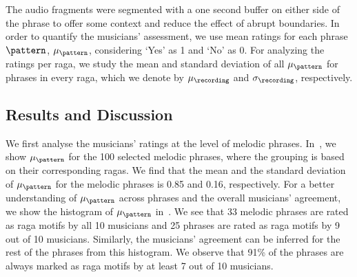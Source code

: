{The audio fragments were segmented with a one second buffer on either side of the phrase to offer some context and reduce the effect of abrupt boundaries. %
In order to quantify the musicians' assessment, we use mean ratings for each phrase $\pattern$, $\mu_\pattern$, considering `Yes' as 1 and `No' as 0. For analyzing the ratings per \gls{raga}, we study the mean and standard deviation of all $\mu_\pattern$ for phrases in every \gls{raga}, which we denote by $\mu_\recording$ and $\sigma_\recording$, respectively.


\subsection{Results and Discussion}
\label{sec:patterns_characterization_results_and_discussion}

We first analyse the musicians' ratings at the level of melodic phrases. In~, we show $\mu_\pattern$ for the 100 selected melodic phrases, where the grouping is based on their corresponding \glspl{raga}. We find that the mean and the standard deviation of $\mu_\pattern$ for the melodic phrases is 0.85 and 0.16, respectively. For a better understanding of $\mu_\pattern$ across phrases and the overall musicians' agreement, we show the histogram of $\mu_\pattern$ in~. We see that 33 melodic phrases are rated as \gls{raga} motifs by all 10 musicians and 25 phrases are rated as \gls{raga} motifs by 9 out of 10 musicians. Similarly, the musicians' agreement can be inferred for the rest of the phrases from this histogram. We observe that 91\% of the phrases are always marked as \gls{raga} motifs by at least 7 out of 10 musicians. 


}
